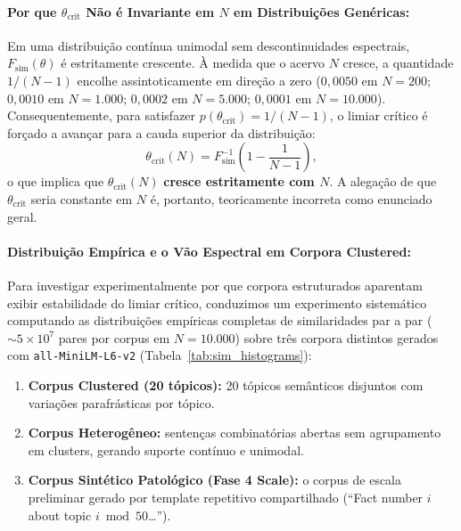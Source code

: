 \documentclass[11pt,a4paper]{article}
\theoremstyle{definition}
\begin{document}
\paragraph{Por que $\theta_{\mathrm{crit}}$ N\~ao \'e Invariante em $N$ em Distribui\c{c}\~oes Gen\'ericas:}
Em uma distribui\c{c}\~ao cont\'inua unimodal sem descontinuidades espectrais, $F_{\mathrm{sim}}(\theta)$ \'e estritamente crescente. \`A medida que o acervo $N$ cresce, a quantidade $1/(N - 1)$ encolhe assintoticamente em dire\c{c}\~ao a zero ($0{,}0050$ em $N = 200$; $0{,}0010$ em $N = 1.000$; $0{,}0002$ em $N = 5.000$; $0{,}0001$ em $N = 10.000$). Consequentemente, para satisfazer $p(\theta_{\mathrm{crit}}) = 1/(N - 1)$, o limiar cr\'itico \'e for\c{c}ado a avan\c{c}ar para a cauda superior da distribui\c{c}\~ao:
\[
\theta_{\mathrm{crit}}(N) = F_{\mathrm{sim}}^{-1}\left(1 - \frac{1}{N - 1}\right),
\]
o que implica que $\theta_{\mathrm{crit}}(N)$ \textbf{cresce estritamente com $N$}. A alega\c{c}\~ao de que $\theta_{\mathrm{crit}}$ seria constante em $N$ \'e, portanto, teoricamente incorreta como enunciado geral.

\paragraph{Distribui\c{c}\~ao Emp\'irica e o V\~ao Espectral em Corpora Clustered:}
Para investigar experimentalmente por que corpora estruturados aparentam exibir estabilidade do limiar cr\'itico, conduzimos um experimento sistem\'atico computando as distribui\c{c}\~oes emp\'iricas completas de similaridades par a par ($\sim 5 \times 10^7$ pares por corpus em $N = 10.000$) sobre tr\^es corpora distintos gerados com \texttt{all-MiniLM-L6-v2} (Tabela~\ref{tab:sim_histograms}):
\begin{enumerate}[label=(\alph*)]
    \item \textbf{Corpus Clustered (20 t\'opicos):} 20 t\'opicos sem\^anticos disjuntos com varia\c{c}\~oes parafr\'asticas por t\'opico.
    \item \textbf{Corpus Heterog\^eneo:} senten\c{c}as combinat\'orias abertas sem agrupamento em clusters, gerando suporte cont\'inuo e unimodal.
    \item \textbf{Corpus Sint\'etico Patol\'ogico (Fase 4 Scale):} o corpus de escala preliminar gerado por template repetitivo compartilhado (``Fact number $i$ about topic $i \bmod 50$\dots'').
\end{enumerate}
\end{document}
